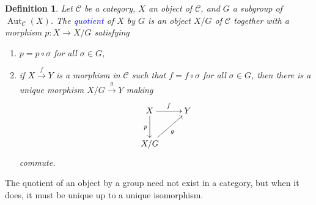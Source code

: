 \documentclass[10pt]{article}
\theoremstyle{thmstyle}
\theoremstyle{defstyle}
\newtheorem{definition}[theorem]{Definition}
\newcommand{\Aut}{\operatorname{Aut}}
\newcommand{\scrC}{\mathscr{C}} %
\newcommand{\define}[1]{\textcolor{blue}{\textit{#1}}}
\begin{document}
\begin{definition}
    Let $\scrC$ be a category, $X$ an object of $\scrC$, and $G$ a subgroup of $\Aut_{\scrC}(X)$. The \define{quotient} of $X$ by $G$ is an object $X/G$ of $\scrC$ together with a morphism $p: X\to X/G$ satisfying
    \begin{enumerate}[label=(\roman*)]
        \item $p = p\circ\sigma$ for all $\sigma\in G$,
        \item if $X\xrightarrow{f} Y$ is a morphism in $\scrC$ such that $f = f\circ\sigma$ for all $\sigma\in G$, then there is a unique morphism $X/G\xrightarrow{g} Y$ making 
        \begin{equation*}
            \xymatrix {
                X\ar[r]^f\ar[d]_p & Y\\
                X/G\ar[ru]_g
            }
        \end{equation*}
        commute.
    \end{enumerate}
\end{definition}

The quotient of an object by a group need not exist in a category, but when it does, it must be unique up to a unique isomorphism.
\end{document}
